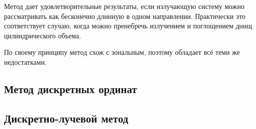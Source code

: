 \begin{FixLineStretch}
\begin{table}
\begin{tabular}{|p{\wA}|p{\wB}|p{\wC}|}
		\end{tabular}
	\end{table}
\end{FixLineStretch}
\let\wC\relax
\let\wB\relax
\let\wA\relax

Метод дает удовлетворительные результаты, если излучающую систему
можно рассматривать как бесконечно длинную в одном направлении.
Практически это соответствует случаю, когда можно пренебречь излучением
и поглощением днищ цилиндрического объема.

По своему принципу метод схож с зональным, поэтому обладает всё теми же недостатками.
\subsection{Метод дискретных ординат}

\subsection{Дискретно-лучевой метод}

